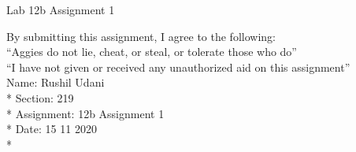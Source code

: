 \documentclass{article}
\begin{document}
{\Large Lab 12b Assignment 1}
\vspace{0.25in}

\noindent
By submitting this assignment, I agree to the following: \\
\indent ``Aggies do not lie, cheat, or steal, or tolerate those who do'' \\
\indent ``I have not given or received any unauthorized aid on this assignment'' \\

\noindent
Name:        Rushil Udani \\*
Section:     219 \\*
Assignment:  12b Assignment 1 \\*
Date:        15 11 2020 \\*

\hrulefill
\end{document}

